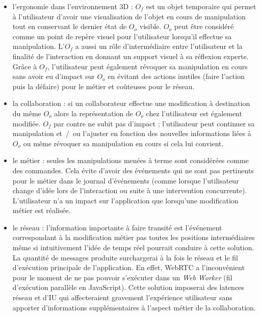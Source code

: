 \begin{itemize}
	\item l'ergonomie dans l'environnement \gls{3D} :
	$O_f$ est un objet temporaire qui permet à l'utilisateur
	d'avoir une visualisation de l'objet en cours de manipulation tout en 
	conservant le dernier état de $O_o$ visible. 
	$O_o$ peut être considéré comme un point de repère visuel pour l'utilisateur 
	lorsqu'il effectue sa manipulation. 
	L'$O_f$ a aussi un rôle d'intermédiaire entre l'utilisateur et la 
	finalité de l'interaction en donnant un support visuel à sa réflexion experte.
	Grâce à $O_f$, l'utilisateur peut également révoquer sa manipulation en 
	cours sans avoir eu d'impact sur $O_o$ en évitant des actions inutiles (faire 
	l'action 
	puis la défaire) pour le métier et coûteuses pour le réseau.
	
	\item la collaboration : si un collaborateur effectue une modification 
	à destination du même $O_o$ alors la représentation de $O_o$ chez 
	l'utilisateur est également modifiée. $O_f$ par contre ne subit pas d'impact ; 
	l'utilisateur peut continuer sa manipulation et~/~ou l'ajuster en fonction des 
	nouvelles informations liées à $O_o$ ou même révoquer sa manipulation 
	en cours si cela lui convient.

	\item le métier : seules les manipulations menées à terme sont 
	considérées comme des commandes. Cela évite d'avoir des événements qui ne 
	sont pas pertinents pour le métier dans le journal d'événements (comme lorsque 
	l'utilisateur change d'idée lors de l'interaction ou
	suite à une intervention concurrente). L'utilisateur n'a un impact sur l'application 
	que lorsqu'une modification métier est réalisée.
	
	\item le réseau : l'information importante à faire transité est l'événement 
	correspondant à la modification métier pas toutes les positions intermédiaires 
	même si intuitivement l'idée de temps réel pourrait conduire à cette solution. La 
	quantité de messages produite surchargerai à la fois le réseau et le fil 
	d'exécution principale de l'application. En effet, \gls{WebRTC} a l'inconvénient 
	pour le 
	moment de ne pas pouvoir s'exécuter dans un \textit{Web Worker} (fil 
	d'exécution 
	parallèle en JavaScript). Cette solution imposerai des 
	latences réseau et d'\gls{IU} qui affecteraient gravement l'expérience utilisateur
	sans apporter d'informations supplémentaires à l'aspect métier de la 
	collaboration. 
\end{itemize}


